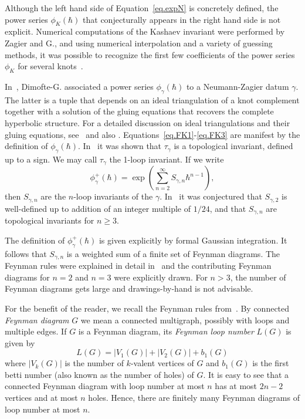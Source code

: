 \documentclass[12pt]{amsart}
\theoremstyle{definition}
\def\ga{\gamma}
\begin{document}
Although the left hand side of Equation~\eqref{eq.expN} is concretely
defined, the power series $\phi_K(\hbar)$ that conjecturally appears in the 
right hand side is not explicit. Numerical computations of the Kashaev 
invariant were performed by Zagier and G., and using numerical 
interpolation and a variety of guessing methods, it was possible to recognize 
the first few coefficients of the power series $\phi_K$ for several 
knots~\cite{GZ1}.

In~\cite{DG}, Dimofte-G. associated a power series $\phi_{\gamma}(\hbar)$
to a Neumann-Zagier datum $\ga$. The latter is a tuple that depends on 
an ideal triangulation of a knot complement together with a solution
of the gluing equations that recovers the complete hyperbolic structure.
For a detailed discussion on ideal triangulations and their gluing equations,
see~\cite{Th,NZ} and also \cite[Sec.1.2]{DG}.
Equations~\eqref{eq.FK1}-\eqref{eq.FK3} are manifest by the definition of
$\phi_\gamma(\hbar)$. In~\cite{DG} it was shown that $\tau_\gamma$ is a 
topological invariant, defined up to a sign. We may call $\tau_\gamma$
the 1-loop invariant. If we write
$$
\phi^+_\gamma(\hbar)=\exp\left(\sum_{n=2}^\infty S_{\gamma,n}\hbar^{n-1}
\right),
$$
then $S_{\gamma,n}$ are the $n$-loop invariants of the $\ga$. In~\cite{DG}
it was conjectured that $S_{\gamma,2}$ is well-defined up to addition of
an integer multiple of $1/24$, and that $S_{\gamma,n}$ are topological
invariants for $n \geq 3$.
 
The definition of $\phi^+_\gamma(\hbar)$ is given explicitly by formal
Gaussian integration. It follows that $S_{\gamma,n}$ is a weighted sum
of a finite set of Feynman diagrams. The Feynman rules were explained in
detail in~\cite[Sec.1.6-1.8]{DG} and the contributing Feynman diagrams for
$n=2$ and $n=3$ were explicitly drawn. For $n>3$, the number of Feynman 
diagrams gets large and drawings-by-hand is not advisable. 

For the benefit of the reader, we recall the Feynman rules 
from~\cite[Sec.1.6-1.8]{DG}. By connected \emph{Feynman diagram} $G$ we mean a 
connected multigraph, possibly with loops and multiple edges.
If $G$ is a Feynman diagram, its \emph{Feynman loop number} $L(G)$ is given by
$$
L(G)=|V_1(G)|+|V_2(G)|+b_1(G) 
$$
where $|V_k(G)|$ is the number of $k$-valent vertices of $G$ and 
$b_1(G)$ is the first betti number (also known as the number of holes) of $G$.
It is easy to see that a connected Feynman diagram with loop number
at most $n$ has at most $2n-2$ vertices and at most $n$ holes.
Hence, there are finitely many Feynman diagrams of loop number at most $n$.
\end{document}

